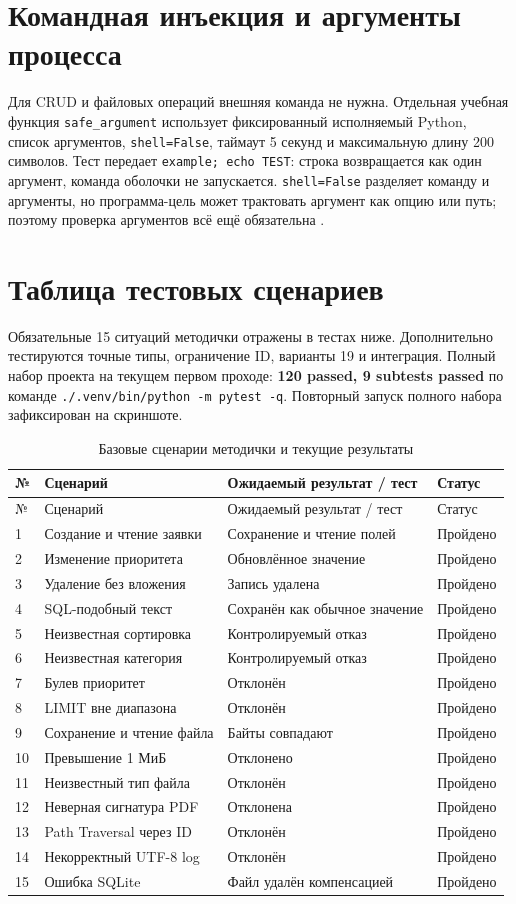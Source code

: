 \documentclass[12pt,a4paper]{article}
\begin{document}
\section{Командная инъекция и аргументы процесса}
Для CRUD и файловых операций внешняя команда не нужна. Отдельная учебная функция \texttt{safe\_argument} использует фиксированный исполняемый Python, список аргументов, \texttt{shell=False}, таймаут 5 секунд и максимальную длину 200 символов. Тест передает \texttt{example; echo TEST}: строка возвращается как один аргумент, команда оболочки не запускается. \texttt{shell=False} разделяет команду и аргументы, но программа-цель может трактовать аргумент как опцию или путь; поэтому проверка аргументов всё ещё обязательна \cite{owaspCommand,cwe78}.

\section{Таблица тестовых сценариев}
Обязательные 15 ситуаций методички отражены в тестах ниже. Дополнительно тестируются точные типы, ограничение ID, варианты 19 и интеграция. Полный набор проекта на текущем первом проходе: \textbf{120 passed, 9 subtests passed} по команде \texttt{./.venv/bin/python -m pytest -q}. Повторный запуск полного набора зафиксирован на скриншоте.
\small
\begin{longtable}{p{0.65cm}p{7.2cm}p{4.35cm}p{1.9cm}}
\caption{Базовые сценарии методички и текущие результаты}\\
\toprule № & Сценарий & Ожидаемый результат / тест & Статус\\ \midrule\endfirsthead
\toprule № & Сценарий & Ожидаемый результат / тест & Статус\\ \midrule\endhead
1 & Создание и чтение заявки & Сохранение и чтение полей & Пройдено\\
2 & Изменение приоритета & Обновлённое значение & Пройдено\\
3 & Удаление без вложения & Запись удалена & Пройдено\\
4 & SQL-подобный текст & Сохранён как обычное значение & Пройдено\\
5 & Неизвестная сортировка & Контролируемый отказ & Пройдено\\
6 & Неизвестная категория & Контролируемый отказ & Пройдено\\
7 & Булев приоритет & Отклонён & Пройдено\\
8 & LIMIT вне диапазона & Отклонён & Пройдено\\
9 & Сохранение и чтение файла & Байты совпадают & Пройдено\\
10 & Превышение 1 МиБ & Отклонено & Пройдено\\
11 & Неизвестный тип файла & Отклонён & Пройдено\\
12 & Неверная сигнатура PDF & Отклонена & Пройдено\\
13 & Path Traversal через ID & Отклонён & Пройдено\\
14 & Некорректный UTF-8 log & Отклонён & Пройдено\\
15 & Ошибка SQLite & Файл удалён компенсацией & Пройдено\\
\bottomrule
\end{longtable}
\normalsize
\end{document}
